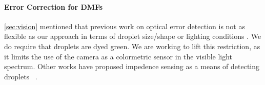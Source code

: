\documentclass{jpaper}
\begin{document}



\paragraph{Error Correction for DMFs}

\autoref{sec:vision} mentioned that previous work on optical error detection is not as flexible as our approach in terms of droplet size/shape \cite{luo2013error} or lighting conditions \cite{shin2010vision, vo2017image-dmf}.
We do require that droplets are dyed green.
We are working to lift this restriction, as it limits the use of the camera as a colormetric sensor in the visible light spectrum.
Other works have proposed impedence sensing as a means of detecting droplets~ \cite{hadwen2012impedence}.
\end{document}
